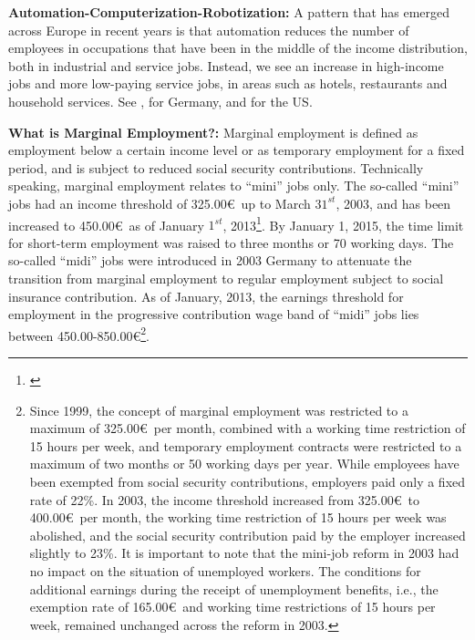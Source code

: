 \documentclass[12pt, a4paper]{article}
\begin{document}
\textbf{Automation-Computerization-Robotization:} A pattern that has emerged across Europe in recent years is that automation reduces the number of employees in occupations that have been in the middle of the income distribution, both in industrial and service jobs. Instead, we see an increase in high-income jobs and more low-paying service jobs, in areas such as hotels, restaurants and household services. See \cite{DuSpOe14}, \cite{SpOe06} for Germany, and \cite{AceRes17} for the US.

\textbf{What is Marginal Employment?:} Marginal employment is defined as employment below a certain income level or as temporary employment for a fixed period, and is subject to reduced social security contributions. Technically speaking, marginal employment relates to “mini” jobs only. The so-called “mini” jobs had an income threshold of 325.00\euro \, up to March $31^{st}$, 2003, and has been increased to 450.00\euro \, as of January $1^{st}$, 2013\footnote{\cite{Fichtl15}}. By January 1, 2015, the time limit for short-term employment was raised to three months or 70 working days. The so-called “midi” jobs were introduced in 2003 Germany to attenuate the transition from marginal employment to regular employment subject to social insurance contribution. As of January, 2013, the earnings threshold for employment in the progressive contribution wage band of “midi” jobs lies between 450.00-850.00\euro\footnote{Since 1999, the concept of marginal employment was restricted to a maximum of 325.00\euro \, per month, combined with a working time restriction of 15 hours per week, and temporary employment contracts were restricted to a maximum of two months or 50 working days per year. While employees have been exempted from social security contributions, employers paid only a fixed rate of 22\%. In 2003, the income threshold increased from 325.00\euro \, to 400.00\euro \, per month, the working time restriction of 15 hours per week was abolished, and the social security contribution paid by the employer increased slightly to 23\%. It is important to note that the mini-job reform in 2003 had no impact on the situation of unemployed workers. The conditions for additional earnings during the receipt of unemployment benefits, i.e., the exemption rate of 165.00\euro \, and working time restrictions of 15 hours per week, remained unchanged across the reform in 2003.}.
\end{document}
